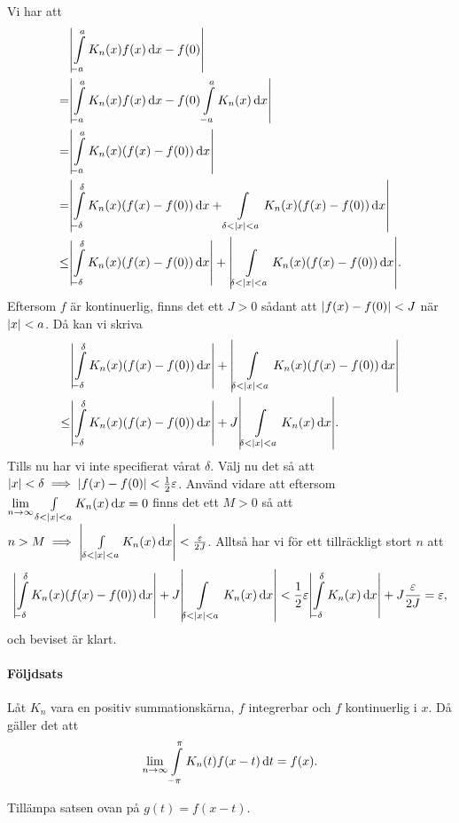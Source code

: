 Vi har att
\begin{align*}
         &\abs{\int\limits_{-a}^{a}K_{n}(x)f(x)\dd{x} - f(0)} \\
	=    &\abs{\int\limits_{-a}^{a}K_{n}(x)f(x)\dd{x} - f(0)\int\limits_{-a}^{a}K_{n}(x)\dd{x}} \\
	=    & \abs{\int\limits_{-a}^{a}K_{n}(x)(f(x) - f(0))\dd{x}} \\
	=    & \abs{\int\limits_{-\delta}^{\delta}K_{n}(x)(f(x) - f(0))\dd{x} + \int\limits_{\delta < \abs{x} < a}^{}K_{n}(x)(f(x) - f(0))\dd{x}} \\
	\leq & \abs{\int\limits_{-\delta}^{\delta}K_{n}(x)(f(x) - f(0))\dd{x}} + \abs{\int\limits_{\delta < \abs{x} < a}^{}K_{n}(x)(f(x) - f(0))\dd{x}}.
\end{align*}
Eftersom $f$ är kontinuerlig, finns det ett $J > 0$ sådant att $\abs{f(x) - f(0)} < J$ när $\abs{x} < a$. Då kan vi skriva
\begin{align*}
	     &\abs{\int\limits_{-\delta}^{\delta}K_{n}(x)(f(x) - f(0))\dd{x}} + \abs{\int\limits_{\delta < \abs{x} < a}^{}K_{n}(x)(f(x) - f(0))\dd{x}} \\
	\leq & \abs{\int\limits_{-\delta}^{\delta}K_{n}(x)(f(x) - f(0))\dd{x}} + J\abs{\int\limits_{\delta < \abs{x} < a}^{}K_{n}(x)\dd{x}}.
\end{align*}
Tills nu har vi inte specifierat vårat $\delta$. Välj nu det så att $\abs{x} < \delta\implies\abs{f(x) - f(0)} < \frac{1}{2}\varepsilon$. Använd vidare att eftersom $\lim\limits_{n\to\infty}\int\limits_{\delta < \abs{x} < a}^{}K_{n}(x)\dd{x} = 0$ finns det ett $M > 0$ så att $n > M\implies \abs{\int\limits_{\delta < \abs{x} < a}^{}K_{n}(x)\dd{x}} < \frac{\varepsilon}{2J}$. Alltså har vi för ett tillräckligt stort $n$ att
\begin{align*}
	\abs{\int\limits_{-\delta}^{\delta}K_{n}(x)(f(x) - f(0))\dd{x}} + J\abs{\int\limits_{\delta < \abs{x} < a}^{}K_{n}(x)\dd{x}} < \frac{1}{2}\varepsilon\abs{\int\limits_{-\delta}^{\delta}K_{n}(x)\dd{x}} + J\frac{\varepsilon}{2J} = \varepsilon,
\end{align*}
och beviset är klart.

\paragraph{Följdsats}
Låt $K_{n}$ vara en positiv summationskärna, $f$ integrerbar och $f$ kontinuerlig i $x$. Då gäller det att
\begin{align*}
	\lim\limits_{n\to\infty}\int\limits_{-\pi}^{\pi}K_{n}(t)f(x - t)\dd{t} = f(x).
\end{align*}

\proof
Tillämpa satsen ovan på $g(t) = f(x - t)$.

